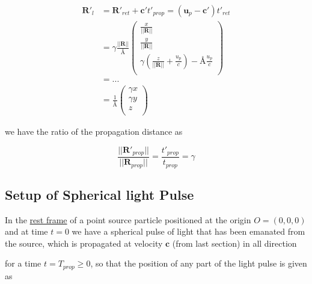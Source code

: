 \begin{equation}
	\begin{split}
		\mathbf{R'}_l & = \mathbf{R'}_{ret} + \mathbf{c'}t'_{prop} = \left( \mathbf{u}_p - \mathbf{c}' \right)t'_{ret} \\
		              & = \gamma \frac{||\mathbf{R}||}{\text{\AA}}
		\begin{pmatrix}
			\frac{x}{||\mathbf{R}||}                                                               \\
			\frac{y}{||\mathbf{R}||}                                                               \\
			\gamma \left( \frac{z}{||\mathbf{R}||} +\frac{u_p}{c}\right) - \text{\AA}\frac{u_p}{c} \\
		\end{pmatrix}
		\\
		              & = ...                                                                                          \\
		              & = \frac{1}{\text{\AA}}
		\begin{pmatrix}
			\gamma x \\
			\gamma y \\
			z        \\
		\end{pmatrix}
	\end{split}
\end{equation}

we have the ratio of the propagation distance as

\begin{equation}
	\dfrac{||\mathbf{R}'_{prop}||}{||\mathbf{R}_{prop}||} = \dfrac{t'_{prop}}{t_{prop}} = \gamma
\end{equation}

\subsection{Setup of Spherical light Pulse}

In the \hyperlink{def-proper-frame}{rest frame} of a point source particle positioned at the origin $O = (0,0,0)$ and at time $t=0$ we have a spherical pulse of light that has been emanated from the source, which is propagated at velocity $\mathbf{c}$ (from last section) in all direction

for a time $t=T_{prop} \geq 0$, so that the position of any part of the light pulse is given as

